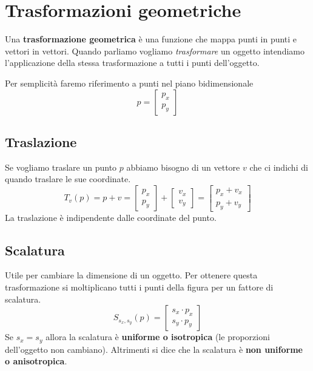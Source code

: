 \section{Trasformazioni geometriche}
Una \textbf{trasformazione geometrica} \`e una funzione che mappa punti in punti e vettori
in vettori. Quando parliamo vogliamo \emph{trasformare} un oggetto intendiamo l'applicazione
della stessa trasformazione a tutti i punti dell'oggetto.

Per semplicit\`a faremo riferimento a punti nel piano bidimensionale
\[ p = \begin{bmatrix} p_x \\ p_y \end{bmatrix} \]

\subsection{Traslazione}
Se vogliamo traslare un punto $p$ abbiamo bisogno di un vettore $v$ che ci indichi di quando
traslare le sue coordinate.
\[
	T_v(p) = p + v =
	\begin{bmatrix}
		p_x \\ p_y
	\end{bmatrix} +
	\begin{bmatrix}
		v_x \\ v_y
	\end{bmatrix} =
	\begin{bmatrix}
		p_x + v_x \\ p_y + v_y
	\end{bmatrix}
\]
La traslazione \`e indipendente dalle coordinate del punto.

\subsection{Scalatura}
Utile per cambiare la dimensione di un oggetto. Per ottenere questa trasformazione si
moltiplicano tutti i punti della figura per un fattore di scalatura.
\[
	S_{s_x, s_y}(p) =
	\begin{bmatrix}
		s_x \cdot p_x \\
		s_y \cdot p_y
	\end{bmatrix}
\]
Se $s_x = s_y$ allora la scalatura \`e \textbf{uniforme o isotropica} (le proporzioni
dell'oggetto non cambiano). Altrimenti si dice che la scalatura \`e
\textbf{non uniforme o anisotropica}.

